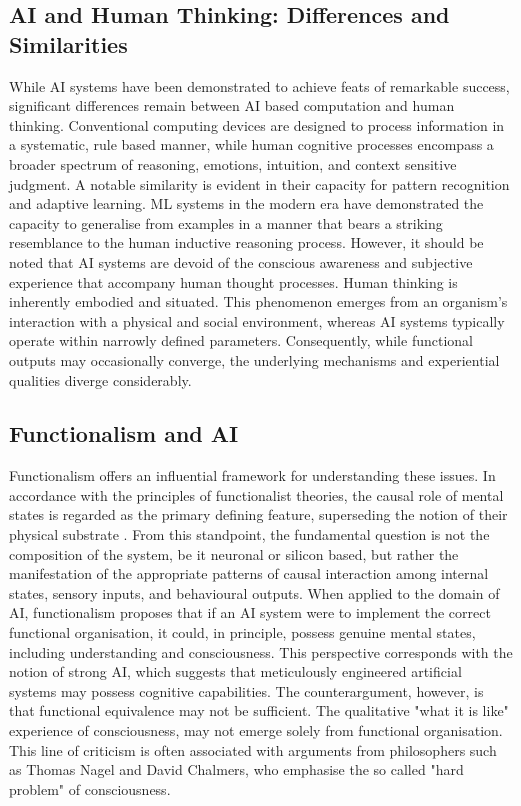\documentclass[runningheads]{llncs}
\begin{document}
\subsection{AI and Human Thinking: Differences and Similarities}
%
While AI systems have been demonstrated to achieve feats of remarkable success, significant differences remain between AI based computation and human thinking. Conventional computing devices are designed to process information in a systematic, rule based manner, while human cognitive processes encompass a broader spectrum of reasoning, emotions, intuition, and context sensitive judgment.
A notable similarity is evident in their capacity for pattern recognition and adaptive learning. ML systems in the modern era have demonstrated the capacity to generalise from examples in a manner that bears a striking resemblance to the human inductive reasoning process. However, it should be noted that AI systems are devoid of the conscious awareness and subjective experience that accompany human thought processes.
Human thinking is inherently embodied and situated. This phenomenon emerges from an organism's interaction with a physical and social environment, whereas AI systems typically operate within narrowly defined parameters. Consequently, while functional outputs may occasionally converge, the underlying mechanisms and experiential qualities diverge considerably.
%
%
\subsection{Functionalism and AI}
%
Functionalism offers an influential framework for understanding these issues. In accordance with the principles of functionalist theories, the causal role of mental states is regarded as the primary defining feature, superseding the notion of their physical substrate \cite{putnam1967psychological}. From this standpoint, the fundamental question is not the composition of the system, be it neuronal or silicon based, but rather the manifestation of the appropriate patterns of causal interaction among internal states, sensory inputs, and behavioural outputs.
When applied to the domain of AI, functionalism proposes that if an AI system were to implement the correct functional organisation, it could, in principle, possess genuine mental states, including understanding and consciousness. This perspective corresponds with the notion of strong AI, which suggests that meticulously engineered artificial systems may possess cognitive capabilities.
The counterargument, however, is that functional equivalence may not be sufficient. The qualitative "what it is like" experience of consciousness, may not emerge solely from functional organisation. This line of criticism is often associated with arguments from philosophers such as Thomas Nagel and David Chalmers, who emphasise the so called "hard problem" of consciousness.
%
%
\end{document}
